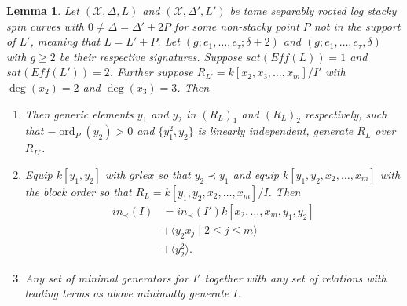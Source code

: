 \documentclass{amsart}
\theoremstyle{plain}
\newtheorem{lem}[thm]{Lemma}
\theoremstyle{definition}
\theoremstyle{remark}
\numberwithin{equation}{section}
\newcommand \sx{\mathscr X}
\DeclareMathOperator{\ord}{ord}
\newcommand \halfcan{L}
\begin{document}
\begin{lem}\label{lem:adding_points_saturation_2_to_1_with_log}
Let $(\sx, \Delta, \halfcan)$ and $(\sx, \Delta', L')$ be tame separably rooted log stacky spin 
curves with $0\ne \Delta=\Delta'+2P$ for some non-stacky point $P$ not in the support of $
\halfcan'$, meaning that $L=L'+P$.  Let $(g; e_1, \ldots, e_\tau; \delta+2)$ and $(g; e_1, 
\ldots, e_\tau, \delta)$ with $g\ge 2$ be their respective signatures.  Suppose 
$sat(Eff(\halfcan))=1$ and $sat(Eff(\halfcan'))=2$.  Further suppose $R_{\halfcan'} = k[x_2, 
x_3, \ldots, x_m]/I'$ with $\deg(x_2) = 2$ and $\deg(x_3) = 3$.  Then
\begin{enumerate}
\item[(a)] Then generic elements $y_1$ and $y_2$ in $(R_{\halfcan})_1$ and $
(R_{\halfcan})_2$ respectively, such that $-\ord_P(y_2)>0$ and $\{y_1^2, y_2\}$ is linearly 
independent, generate $R_\halfcan$ over $R_{\halfcan'}$.
\item[(b)] Equip $k[y_1,y_2]$ with $grlex$ so that $y_2 \prec y_1$ and equip $k[y_1, y_2, 
x_2, \ldots, x_m]$ with the block order so that $R_\halfcan=k[y_1, y_2, x_2, \ldots, x_m]/I$.  
Then
\begin{align*}
			in_\prec(I) &= in_\prec(I')k[x_2, \ldots, x_m, y_1, y_2] \\
			&+\langle y_2 x_j \mid 2 \leq j \leq m \rangle \\
			&+\langle y_2^2\rangle.
		\end{align*}
\item[(c)] Any set of minimal generators for $I'$ together with any set of relations with 
leading terms as above minimally generate $I$.
\end{enumerate}
\end{lem}
\end{document}
